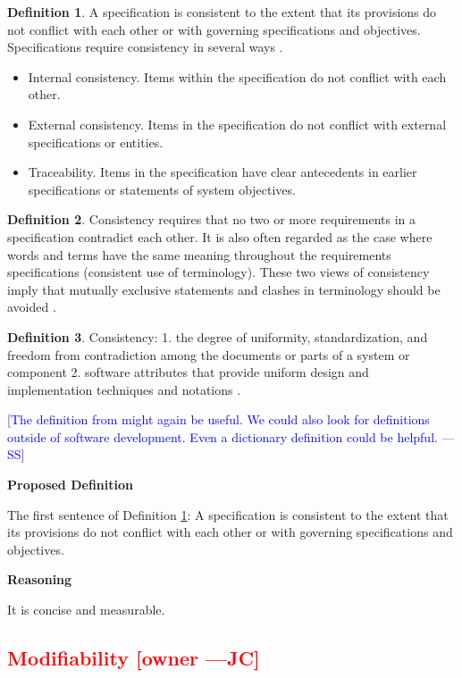 \documentclass[letterpaper,cleveref]{lipics-v2019}
\newcommand{\authornote}[3]{\textcolor{#1}{[#3 ---#2]}}
\newcommand{\authornote}[3]{}
\newcommand{\wss}[1]{\authornote{blue}{SS}{#1}} %
\newcommand{\jc}[1]{\authornote{red}{JC}{#1}} %
\newcommand{\notdone}[1]{\textcolor{red}{#1}}
\theoremstyle{definition}
\newtheorem{defn}{Definition}
\begin{document}
\begin{defn}
	\label{ConsistencySelected}
	A specification is consistent to the extent that its provisions do not conflict
	with each other or with governing specifications and objectives. Specifications
	require consistency in several ways \citep{Boehm1984}.
	\begin{itemize}
		\item Internal consistency. Items within the specification do not conflict with
		each other.
		\item External consistency. Items in the specification do not conflict with
		external specifications or entities.
		\item Traceability. Items in the specification have clear antecedents in earlier
		specifications or statements of system objectives.
	\end{itemize}
\end{defn}
\begin{defn}
	Consistency requires that no two or more requirements in a specification
	contradict each other. It is also often regarded as the case where words and
	terms have the same meaning throughout the requirements specifications
	(consistent use of terminology). These two views of consistency imply that
	mutually exclusive statements and clashes in terminology should be avoided
	\citep{ZOWGHI2003}.
\end{defn}
\begin{defn}
	Consistency: 1. the degree of uniformity, standardization, and freedom from
	contradiction among the documents or parts of a system or component 2. software
	attributes that provide uniform design and implementation techniques and
	notations \citep{ISO/IEC/IEEE24765}.
\end{defn}

\wss{The definition from \citet{IEEE1998} might again be useful.  We could also
	look for definitions outside of software development.  Even a dictionary
	definition could be helpful.}

\noindent \textbf{Proposed Definition} 

The first sentence of Definition \ref{ConsistencySelected}: A specification is
consistent to the extent that its provisions do not conflict with each other or
with governing specifications and objectives.

\noindent \textbf{Reasoning}

It is concise and measurable.

\subsection{\notdone{Modifiability} \jc{owner}}
\end{document}

